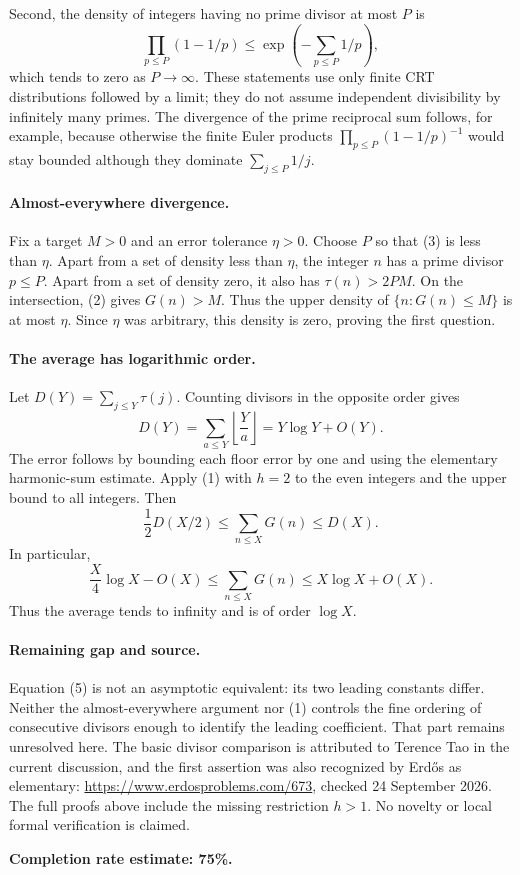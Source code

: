 Second, the density of integers having no prime divisor at most \(P\) is
\[
 \prod_{p\leq P}(1-1/p)\leq\exp\left(-\sum_{p\leq P}1/p\right), \tag{3}
\]
which tends to zero as \(P\to\infty\). These statements use only finite CRT distributions followed by a limit; they do not assume independent divisibility by infinitely many primes. The divergence of the prime reciprocal sum follows, for example, because otherwise the finite Euler products \(\prod_{p\leq P}(1-1/p)^{-1}\) would stay bounded although they dominate \(\sum_{j\leq P}1/j\).

\paragraph{Almost-everywhere divergence.}
Fix a target \(M>0\) and an error tolerance \(\eta>0\). Choose \(P\) so that (3) is less than \(\eta\). Apart from a set of density less than \(\eta\), the integer \(n\) has a prime divisor \(p\leq P\). Apart from a set of density zero, it also has \(\tau(n)>2PM\). On the intersection, (2) gives \(G(n)>M\). Thus the upper density of \(\{n:G(n)\leq M\}\) is at most \(\eta\). Since \(\eta\) was arbitrary, this density is zero, proving the first question.

\paragraph{The average has logarithmic order.}
Let \(D(Y)=\sum_{j\leq Y}\tau(j)\). Counting divisors in the opposite order gives
\[
 D(Y)=\sum_{a\leq Y}\left\lfloor\frac Ya\right\rfloor
 =Y\log Y+O(Y). \tag{4}
\]
The error follows by bounding each floor error by one and using the elementary harmonic-sum estimate. Apply (1) with \(h=2\) to the even integers and the upper bound to all integers. Then
\[
 \frac12D(X/2)\leq\sum_{n\leq X}G(n)\leq D(X).
\]
In particular,
\[
 \frac X4\log X-O(X)
 \leq\sum_{n\leq X}G(n)
 \leq X\log X+O(X). \tag{5}
\]
Thus the average tends to infinity and is of order \(\log X\).

\paragraph{Remaining gap and source.}
Equation (5) is not an asymptotic equivalent: its two leading constants differ. Neither the almost-everywhere argument nor (1) controls the fine ordering of consecutive divisors enough to identify the leading coefficient. That part remains unresolved here. The basic divisor comparison is attributed to Terence Tao in the current discussion, and the first assertion was also recognized by Erd\H{o}s as elementary: \url{https://www.erdosproblems.com/673}, checked 24 September 2026. The full proofs above include the missing restriction \(h>1\). No novelty or local formal verification is claimed.

\textbf{Completion rate estimate: 75\%.}
